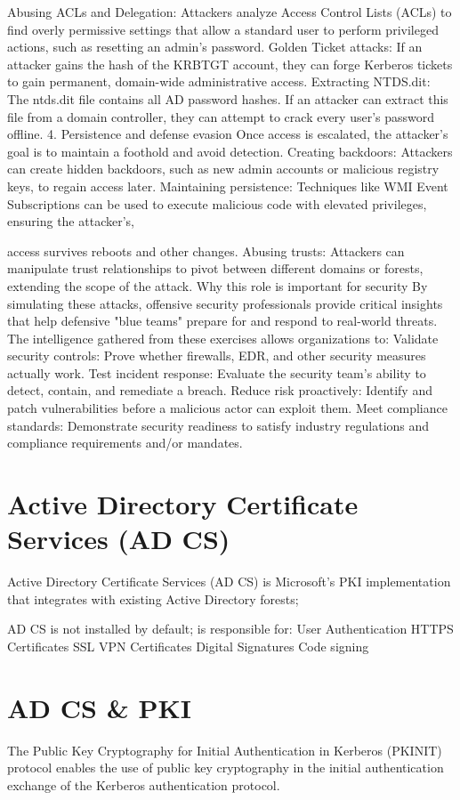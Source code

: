 Abusing ACLs and Delegation: Attackers analyze Access Control Lists (ACLs) to find overly permissive settings that allow a standard user to perform privileged actions, such as resetting an admin's password.
Golden Ticket attacks: If an attacker gains the hash of the KRBTGT account, they can forge Kerberos tickets to gain permanent, domain-wide administrative access.
Extracting NTDS.dit: The ntds.dit file contains all AD password hashes. If an attacker can extract this file from a domain controller, they can attempt to crack every user's password offline. 
4. Persistence and defense evasion
Once access is escalated, the attacker's goal is to maintain a foothold and avoid detection.
Creating backdoors: Attackers can create hidden backdoors, such as new admin accounts or malicious registry keys, to regain access later.
Maintaining persistence: Techniques like WMI Event Subscriptions can be used to execute malicious code with elevated privileges, ensuring the attacker's, 

access survives reboots and other changes.
Abusing trusts: Attackers can manipulate trust relationships to pivot between different domains or forests, extending the scope of the attack. 
Why this role is important for security
By simulating these attacks, offensive security professionals provide critical insights that help defensive "blue teams" prepare for and respond to real-world threats. The intelligence gathered from these exercises allows organizations to:
Validate security controls: Prove whether firewalls, EDR, and other security measures actually work.
Test incident response: Evaluate the security team's ability to detect, contain, and remediate a breach.
Reduce risk proactively: Identify and patch vulnerabilities before a malicious actor can exploit them.
Meet compliance standards: Demonstrate security readiness to satisfy industry regulations and compliance requirements and/or mandates.

\section{Active Directory Certificate Services (AD CS)}
Active Directory Certificate Services (AD CS) is Microsoft's PKI implementation that integrates with existing Active Directory forests;

AD CS is not installed by default; is responsible for:
User Authentication
HTTPS Certificates
SSL VPN Certificates
Digital Signatures
Code signing

\section{AD CS \& PKI}
The Public Key Cryptography for Initial Authentication in Kerberos (PKINIT) protocol enables the use of public key cryptography in the initial authentication exchange of the Kerberos authentication protocol.

